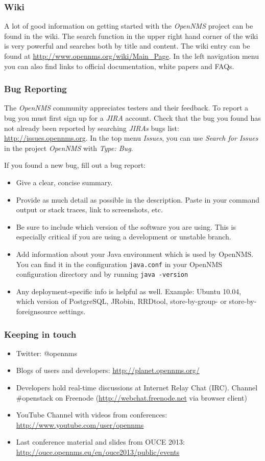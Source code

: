 \subsubsection{Wiki}
A lot of good information on getting started with the \emph{OpenNMS} project can be found in the wiki. The search function in the upper right hand corner of the wiki is very powerful and searches both by title and content. The wiki entry can be found at \url{http://www.opennms.org/wiki/Main_Page}. In the left navigation menu you can also find links to official documentation, white papers and FAQs.

\subsubsection{Bug Reporting}
The \emph{OpenNMS} community appreciates testers and their feedback. To report a bug you must first sign up for a \emph{JIRA} account. Check that the bug you found has not already been reported by searching \emph{JIRAs} bugs list: \url{http://issues.opennms.org}. In the top menu \emph{Issues}, you can use \emph{Search for Issues} in the project \emph{OpenNMS} with \emph{Type: Bug}.

If you found a new bug, fill out a bug report:
\begin{itemize}
  \item Give a clear, concise summary.
  \item Provide as much detail as possible in the description. Paste in your command output or stack traces, link to screenshots, etc.
  \item Be sure to include which version of the software you are using. This is especially critical if you are using a development or unstable branch.
  \item Add information about your Java environment which is used by OpenNMS. You can find it in the configuration \texttt{java.conf} in your OpenNMS configuration directory and by running \texttt{java -version} 
  \item Any deployment-specific info is helpful as well. Example: Ubuntu 10.04, which version of PostgreSQL, JRobin, RRDtool, store-by-group- or store-by-foreignsource settings.
\end{itemize}

\subsubsection{Keeping in touch}
\begin{itemize}
  \item Twitter: @opennms
  \item Blogs of users and developers: \url{http://planet.opennms.org/}
  \item Developers hold real-time discussions at Internet Relay Chat (IRC). Channel \#openstack on Freenode (\url{http://webchat.freenode.net} via browser client)
  \item YouTube Channel with videos from conferences: \url{http://www.youtube.com/user/opennms}
  \item Last conference material and slides from OUCE 2013: \url{http://ouce.opennms.eu/en/ouce2013/public/events}
\end{itemize}

